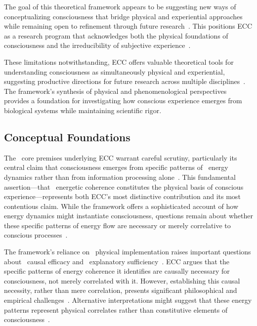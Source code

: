 The goal of this theoretical framework appears to be suggesting new ways of conceptualizing consciousness that bridge physical and experiential approaches while remaining open to refinement through future research~\cite{chalmers2010character}. This positions ECC as a research program that acknowledges both the physical foundations of consciousness and the irreducibility of subjective experience~\cite{churchland2013touching}.

These limitations notwithstanding, ECC offers valuable theoretical tools for understanding consciousness as simultaneously physical and experiential, suggesting productive directions for future research across multiple disciplines~\cite{feinberg2016ancient, sheets2011primacy}. The framework's synthesis of physical and phenomenological perspectives provides a foundation for investigating how conscious experience emerges from biological systems while maintaining scientific rigor.

\subsection*{Conceptual Foundations}

The~ core premises underlying ECC warrant careful scrutiny, particularly its central claim that consciousness emerges from specific patterns of~ energy dynamics rather than from information processing alone~\cite{koch2019feeling, varela2016embodied}. This fundamental assertion—that~ energetic coherence constitutes the physical basis of conscious experience—represents both ECC's most distinctive contribution and its most contentious claim. While the framework offers a sophisticated account of how energy dynamics might instantiate consciousness, questions remain about whether these specific patterns of energy flow are necessary or merely correlative to conscious processes~\cite{dennett2017bacteria, thompson2014waking}.

The framework's reliance on~ physical implementation raises important questions about~ causal efficacy and~ explanatory sufficiency~\cite{chalmers2010character}. ECC argues that the specific patterns of energy coherence it identifies are causally necessary for consciousness, not merely correlated with it. However, establishing this causal necessity, rather than mere correlation, presents significant philosophical and empirical challenges~\cite{seth2021being}. Alternative interpretations might suggest that these energy patterns represent physical correlates rather than constitutive elements of consciousness~\cite{churchland2013touching, block2009comparing}.

